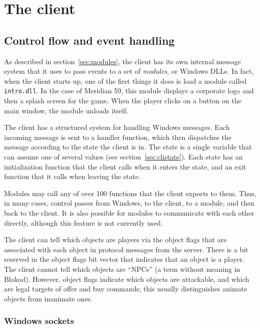 \section{The client}

\subsection{Control flow and event handling}

As described in section~\ref{sec:modules}, the client has its own
internal message system that it uses to pass events to a set of {\em
modules}, or Windows DLLs.  In fact, when the client starts up, one of
the first things it does is load a module called {\tt intro.dll}.  In
the case of Meridian 59, this module displays a corporate logo and
then a splash screen for the game.  When the player clicks on a button
on the main window, the module unloads itself.

The client has a structured system for handling Windows messages.
Each incoming message is sent to a handler function, which then
dispatches the message according to the state the client is in.  The
state is a single variable that can assume one of several values (see
section~\ref{sec:clistate}).  Each state has an initialization
function that the client calls when it enters the state, and an exit
function that it calls when leaving the state.

Modules may call any of over 100 functions that the client exports to
them.  Thus, in many cases, control passes from Windows, to the
client, to a module, and then back to the client.  It is also possible
for modules to communicate with each other directly, although this
feature is not currently used.

The client can tell which objects are players via the object flags
that are associated with each object in protocol messages from the
server.  There is a bit reserved in the object flags bit vector that
indicates that an object is a player.  The client cannot tell which
objects are ``NPCs'' (a term without meaning in Blakod).  However,
object flags indicate which objects are attackable, and which are
legal targets of offer and buy commands; this usually distinguishes
animate objects from inanimate ones.

\subsubsection{Windows sockets}

